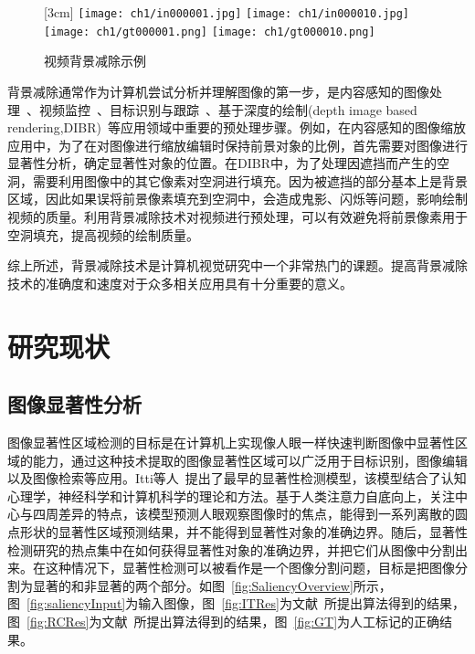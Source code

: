 \begin{figure}[ht]
  \centering%
  [3cm] %
    {\texttt{[image: ch1/in000001.jpg]}}%
  \hspace{1em}%
      {\texttt{[image: ch1/in000010.jpg]}}
  \hspace{1em}%
      {\texttt{[image: ch1/gt000001.png]}}
   \hspace{1em}%
    {\texttt{[image: ch1/gt000010.png]}}

  \caption{视频背景减除示例}
  \label{fig:videoBS}
\end{figure}
\par

背景减除通常作为计算机尝试分析并理解图像的第一步，是内容感知的图像处理~\cite{Avidan:2007}、视频监控~\cite{Collins1998A}、目标识别与跟踪~\cite{YilmazTracking}、基于深度的绘制(depth image based rendering,DIBR)~\cite{Fehn03a3d-tv}等应用领域中重要的预处理步骤。例如，在内容感知的图像缩放应用中，为了在对图像进行缩放编辑时保持前景对象的比例，首先需要对图像进行显著性分析，确定显著性对象的位置。在DIBR中，为了处理因遮挡而产生的空洞，需要利用图像中的其它像素对空洞进行填充。因为被遮挡的部分基本上是背景区域，因此如果误将前景像素填充到空洞中，会造成鬼影、闪烁等问题，影响绘制视频的质量。利用背景减除技术对视频进行预处理，可以有效避免将前景像素用于空洞填充，提高视频的绘制质量。\par

综上所述，背景减除技术是计算机视觉研究中一个非常热门的课题。提高背景减除技术的准确度和速度对于众多相关应用具有十分重要的意义。
\section{研究现状}
\label{sec:second}
\subsection{图像显著性分析}
\label{sec:imageSaliency}
图像显著性区域检测的目标是在计算机上实现像人眼一样快速判断图像中显著性区域的能力，通过这种技术提取的图像显著性区域可以广泛用于目标识别，图像编辑以及图像检索等应用。Itti等人~\cite{itti}提出了最早的显著性检测模型，该模型结合了认知心理学，神经科学和计算机科学的理论和方法。基于人类注意力自底向上，关注中心与四周差异的特点，该模型预测人眼观察图像时的焦点，能得到一系列离散的圆点形状的显著性区域预测结果，并不能得到显著性对象的准确边界。随后，显著性检测研究的热点集中在如何获得显著性对象的准确边界，并把它们从图像中分割出来。在这种情况下，显著性检测可以被看作是一个图像分割问题，目标是把图像分割为显著的和非显著的两个部分。如图~\ref{fig:SaliencyOverview}所示，图~\ref{fig:saliencyInput}为输入图像，图~\ref{fig:ITRes}为文献~所提出算法得到的结果，图~\ref{fig:RCRes}为文献~所提出算法得到的结果，图~\ref{fig:GT}为人工标记的正确结果。

